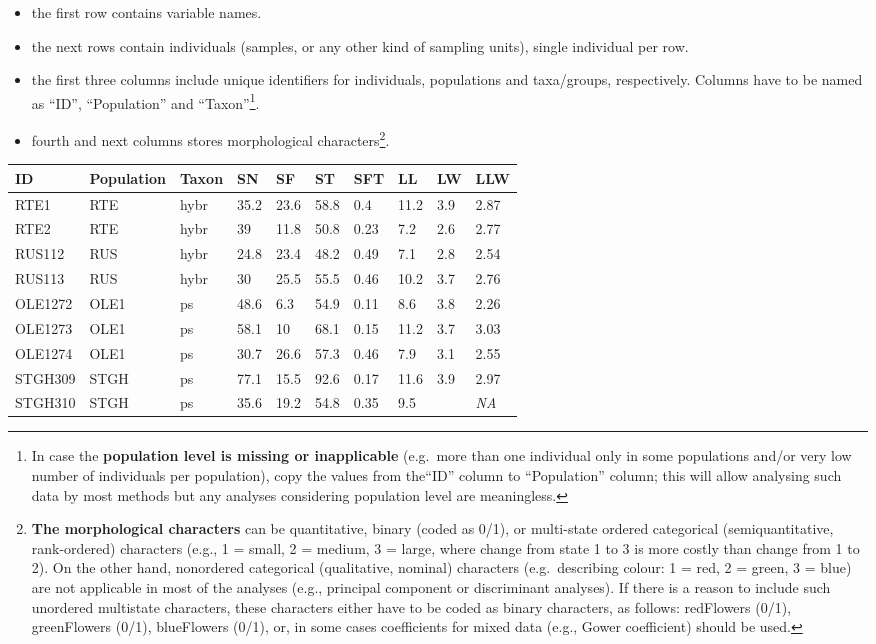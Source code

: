 \documentclass[
]{article}
\providecommand{\tightlist}{%
  \setlength{\itemsep}{0pt}\setlength{\parskip}{0pt}}
\begin{document}
\begin{itemize}
\tightlist
\item
  the first row contains variable names.
\item
  the next rows contain individuals (samples, or any other kind of
  sampling units), single individual per row.
\item
  the first three columns include unique identifiers for individuals,
  populations and taxa/groups, respectively. Columns have to be named as
  ``ID'', ``Population'' and ``Taxon''\footnote{In case the
    \textbf{population level is missing or inapplicable} (e.g.~more than
    one individual only in some populations and/or very low number of
    individuals per population), copy the values from the``ID'' column
    to ``Population'' column; this will allow analysing such data by
    most methods but any analyses considering population level are
    meaningless.}.
\item
  fourth and next columns stores morphological characters\footnote{\textbf{The
    morphological characters} can be quantitative, binary (coded as
    0/1), or multi-state ordered categorical (semiquantitative,
    rank-ordered) characters (e.g., 1 = small, 2 = medium, 3 = large,
    where change from state 1 to 3 is more costly than change from 1 to
    2). On the other hand, nonordered categorical (qualitative, nominal)
    characters (e.g.~describing colour: 1 = red, 2 = green, 3 = blue)
    are not applicable in most of the analyses (e.g., principal
    component or discriminant analyses). If there is a reason to include
    such unordered multistate characters, these characters either have
    to be coded as binary characters, as follows: redFlowers (0/1),
    greenFlowers (0/1), blueFlowers (0/1), or, in some cases
    coefficients for mixed data (e.g., Gower coefficient) should be
    used.}.
\end{itemize}

\begin{longtable}[]{@{}llllllllll@{}}
\toprule
ID & Population & Taxon & SN & SF & ST & SFT & LL & LW &
LLW\tabularnewline
\midrule
\endhead
RTE1 & RTE & hybr & 35.2 & 23.6 & 58.8 & 0.4 & 11.2 & 3.9 &
2.87\tabularnewline
RTE2 & RTE & hybr & 39 & 11.8 & 50.8 & 0.23 & 7.2 & 2.6 &
2.77\tabularnewline
RUS112 & RUS & hybr & 24.8 & 23.4 & 48.2 & 0.49 & 7.1 & 2.8 &
2.54\tabularnewline
RUS113 & RUS & hybr & 30 & 25.5 & 55.5 & 0.46 & 10.2 & 3.7 &
2.76\tabularnewline
OLE1272 & OLE1 & ps & 48.6 & 6.3 & 54.9 & 0.11 & 8.6 & 3.8 &
2.26\tabularnewline
OLE1273 & OLE1 & ps & 58.1 & 10 & 68.1 & 0.15 & 11.2 & 3.7 &
3.03\tabularnewline
OLE1274 & OLE1 & ps & 30.7 & 26.6 & 57.3 & 0.46 & 7.9 & 3.1 &
2.55\tabularnewline
STGH309 & STGH & ps & 77.1 & 15.5 & 92.6 & 0.17 & 11.6 & 3.9 &
2.97\tabularnewline
STGH310 & STGH & ps & 35.6 & 19.2 & 54.8 & 0.35 & 9.5 & &
\emph{NA}\tabularnewline
\bottomrule
\end{longtable}
\end{document}
